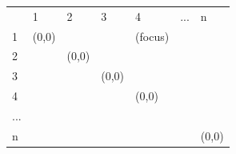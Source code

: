 \documentclass[a4paper]{article}
\begin{document}
\begin{table}[htb]
\centering
\begin{tabular}{lllllll}
                       & 1                                                  & 2                                             & 3                                             & 4                                                    & ...                   & n                          \\ \cline{2-5} \cline{7-7} 
\multicolumn{1}{l|}{1} & \multicolumn{1}{l|}{\cellcolor[HTML]{FFCCC9}(0,0)} & \multicolumn{1}{l|}{\cellcolor[HTML]{FFCCC9}} & \multicolumn{1}{l|}{\cellcolor[HTML]{FFCCC9}} & \multicolumn{1}{l|}{\cellcolor[HTML]{FE0000}(focus)} & \multicolumn{1}{l|}{} & \multicolumn{1}{l|}{}      \\ \cline{2-5} \cline{7-7} 
2                      & \multicolumn{1}{l|}{}                              & \multicolumn{1}{l|}{(0,0)}                    & \multicolumn{1}{l|}{}                         & \multicolumn{1}{l|}{\cellcolor[HTML]{FFCCC9}}        & \multicolumn{1}{l|}{} & \multicolumn{1}{l|}{}      \\ \cline{3-5} \cline{7-7} 
3                      &                                                    & \multicolumn{1}{l|}{}                         & \multicolumn{1}{l|}{(0,0)}                    & \multicolumn{1}{l|}{\cellcolor[HTML]{FFCCC9}}        & \multicolumn{1}{l|}{} & \multicolumn{1}{l|}{}      \\ \cline{4-5} \cline{7-7} 
4                      &                                                    &                                               & \multicolumn{1}{l|}{}                         & \multicolumn{1}{l|}{\cellcolor[HTML]{FFCCC9}(0,0)}   & \multicolumn{1}{l|}{} & \multicolumn{1}{l|}{}      \\ \cline{5-5} \cline{7-7} 
...                    &                                                    &                                               &                                               &                                                      &                       &                            \\ \cline{7-7} 
n                      &                                                    &                                               &                                               &                                                      & \multicolumn{1}{l|}{} & \multicolumn{1}{l|}{(0,0)} \\ \cline{7-7} 
\end{tabular}
\end{table}
\end{document}
